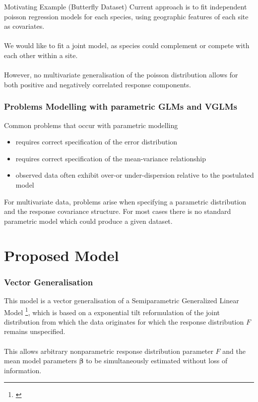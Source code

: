 \documentclass[9pt,notes=hide]{beamer}
\newcommand{\vect}[1]{\boldsymbol #1}
\newcommand{\vbe}{\vect{\beta}}
\begin{document}
\begin{frame}{Motivating Example (Butterfly Dataset)}
	Current approach is to fit independent poisson regression models for each
	species,  using geographic features of each site as covariates.\\
	\pause
	\vspace{0.1cm}\\
	We would like to fit a joint model, as species could complement or compete
	with each other within a site. \\
	\pause
	\vspace{0.1cm}\\
	However, no multivariate generalisation of the poisson distribution allows
	for both positive and negatively correlated response components.
\end{frame}




\begin{frame}
	\frametitle{Problems Modelling with parametric GLMs and VGLMs}
	Common problems that occur with parametric modelling\pause
	\begin{itemize}[<+->]
		\item requires correct specification of the error distribution
		\item requires correct specification of the mean-variance relationship
		\item observed data often exhibit over-or under-dispersion relative to the postulated model
	\end{itemize}
	\pause[\thebeamerpauses]
	For multivariate data, problems arise when specifying a parametric distribution and the response covariance structure.
	For most cases there is no standard parametric model which could produce a given dataset.
\end{frame}


\section{Proposed Model}


\begin{frame}
	\frametitle{Vector Generalisation}
	This model is a vector generalisation of a Semiparametric  Generalized Linear
	Model \footnote{\parencite{Rathouz2009, Huang2012, Huang2014}}, which is
	based on a exponential tilt reformulation of the joint distribution from
	which the data originates for which  the response distribution $F$  remains
	unspecified. \\
	\pause
	\vspace{0.1cm}\\

	This allows  arbitrary nonparametric response distribution parameter $F$ and
	the  mean model parameters $\vbe$ to be simultaneously estimated without
	loss of information.

\end{frame}
\end{document}
